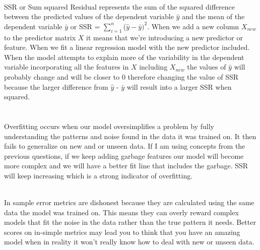 \documentclass[12pt]{article}
\begin{document}
\begin{enumerate}
 \\
SSR or Sum squared Residual represents the sum of the squared difference between the predicted values of the dependent variable \( \hat{y}\) and the mean of the dependent variable \(\bar{y}\) or SSR = \(\sum\limits_{i=1}^n\)(\(\hat{y} - \bar{y})^2\). When we add a new column \(X_{new}\) to the predictor matrix \(X\) it means that we're introducing a new predictor or feature. When we fit a linear regression model with the new predictor included. When the model attempts to explain more of the variability in the dependent variable incorporating all the features in \(X\) including \(X_{new}\) the values of \( \hat{y}\) will probably change and will be closer to 0 therefore changing the value of SSR because the larger difference from \( \hat{y} \) - \( \bar{y}\) will result into a larger SSR when squared. \\ \\

 \\
Overfitting occurs when our model oversimplifies a problem by fully understanding the patterns and noise found in the data it was trained on. It then fails to generalize on new and or unseen data. If I am using concepts from the previous questions, if we keep adding garbage features our model will become more complex and we will have a better fit line that includes the garbage. SSR will keep increasing which is a strong indicator of overfitting.

 \\ 
In sample error metrics are dishonest because they are calculated using the same data the model was trained on. This means they can overly reward complex models that fit the noise in the data rather than the true pattern it needs. Better scores on in-simple metrics may lead you to think that you have an amazing model when in reality it won't really know how to deal with new or unseen data. 


\end{enumerate}
\end{document}
